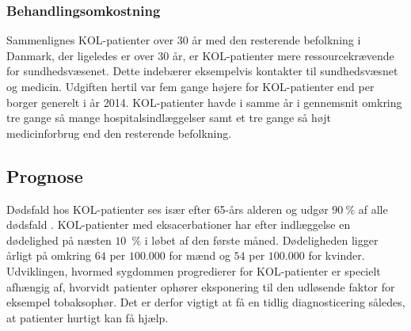 \subsubsection{Behandlingsomkostning}
Sammenlignes KOL-patienter over 30 år med den resterende befolkning i Danmark, der ligeledes er over 30 år, er KOL-patienter mere ressourcekrævende for sundhedsvæsenet. Dette indebærer eksempelvis kontakter til sundhedsvæsnet og medicin. Udgiften hertil var fem gange højere for KOL-patienter end per borger generelt i år 2014. KOL-patienter havde i samme år i gennemsnit omkring tre gange så mange hospitalsindlæggelser samt et tre gange så højt medicinforbrug end den resterende befolkning.\cite{Kontaktforbrug2016}

\subsection{Prognose}
Dødsfald hos KOL-patienter ses især efter 65-års alderen og udgør $90~\%$ af alle dødsfald \cite{Folkesundhed2007}.
KOL-patienter med eksacerbationer har efter indlæggelse en dødelighed på næsten $10$~$\%$ i løbet af den første måned. Dødeligheden ligger årligt på omkring $64$ per $100.000$ for mænd og $54$ per $100.000$ for kvinder.
Udviklingen, hvormed sygdommen progredierer for KOL-patienter er specielt afhængig af, hvorvidt patienter ophører eksponering til den udløsende faktor for eksempel tobaksophør. Det er derfor vigtigt at få en tidlig diagnosticering således, at patienter hurtigt kan få hjælp.\cite{dsam2016}
